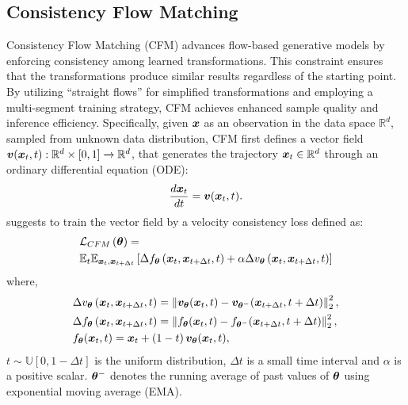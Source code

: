 \subsection{Consistency Flow Matching}
Consistency Flow Matching (CFM) advances flow-based generative models \cite{chen2018neural,lipman2023flow,liu2023flow} by enforcing consistency among learned transformations. This constraint ensures that the transformations produce similar results regardless of the starting point. By utilizing ``straight flows'' for simplified transformations and employing a multi-segment training strategy, CFM achieves enhanced sample quality and inference efficiency. Specifically, given $\vectorsym{x}$ as an observation in the data space $\mathbb{R}^d$, sampled from unknown data distribution, CFM first defines a vector field $\vectorsym{v}(\vectorsym{x}_t,t):\mathbb{R}^d\times[0,1]\xrightarrow{}\mathbb{R}^d$, that generates the trajectory $\vectorsym{x}_t \in \mathbb{R}^d$ through an ordinary differential equation (ODE):
\begin{align}\label{ode}
    \frac{d\vectorsym{x}_t}{dt} = \vectorsym{v}(\vectorsym{x}_t,t).
\end{align}
\citet{yang2024consistencyfm} suggests to train the vector field by a velocity consistency loss defined as:
\begin{align}\label{cfm_loss}
&\mathcal{L}_{CFM}\brackets{\vectorsym{\theta}}
=\\
&\mathbb{E}_{t}\expectation{\Delta f_{\vectorsym{\theta}}\brackets{\vectorsym{x}_t,\vectorsym{x}_{t+\Delta t},t}+\alpha\Delta v_{\vectorsym{\theta}}\brackets{\vectorsym{x}_t,\vectorsym{x}_{t+\Delta t},t} }{\vectorsym{x}_{t},\vectorsym{x}_{t+\Delta t}}\nonumber
\end{align}
where, 
\begin{align}
    &\Delta v_{\vectorsym{\theta}}\brackets{\vectorsym{x}_t,\vectorsym{x}_{t+\Delta t},t}=\norm{\vectorsym{v}_{\vectorsym{\theta}}(\vectorsym{x}_t,t)-\vectorsym{v}_{\vectorsym{\theta}^{-}}(\vectorsym{x}_{t+\Delta t},t+\Delta t)}_2^2,\nonumber\\
    &\Delta{f}_{\p}\brackets{\vectorsym{x}_t,\vectorsym{x}_{t+\Delta t},t}=\norm{f_{\vectorsym{\theta}}(\vectorsym{x}_t,t)-f_{\vectorsym{\theta}^{-}}(\vectorsym{x}_{t+\Delta t},t+\Delta t)}_2^2,\nonumber\\
    &f_{\vectorsym{\theta}}(\vectorsym{x}_t,t) = \vectorsym{x}_t + \brackets{1-t}\vectorsym{v}_{\vectorsym{\theta}}(\vectorsym{x}_{t},t),\nonumber
\end{align}
$t\sim\mathbb{U}[0,1-\Delta t]$ is the uniform distribution, $\Delta t$ is a small time interval and $\alpha$ is a positive scalar. $\vectorsym{\theta}^{-}$ denotes the running average of past values of $\vectorsym{\theta}$ using exponential moving average (EMA). 

